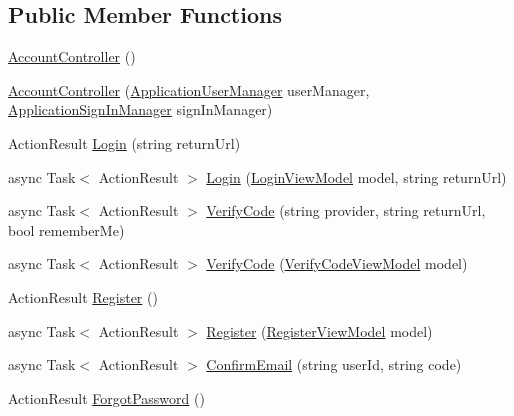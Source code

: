 \subsection*{Public Member Functions}
\begin{DoxyCompactItemize}
\item 
\hyperlink{class_bibabook_1_1_controllers_1_1_account_controller_a7d8fb75f85b1b2e21c791b8e7fbf2b04}{Account\+Controller} ()
\item 
\hyperlink{class_bibabook_1_1_controllers_1_1_account_controller_ae63289a87668ea58c877b1a898375a32}{Account\+Controller} (\hyperlink{class_bibabook_1_1_application_user_manager}{Application\+User\+Manager} user\+Manager, \hyperlink{class_bibabook_1_1_application_sign_in_manager}{Application\+Sign\+In\+Manager} sign\+In\+Manager)
\item 
Action\+Result \hyperlink{class_bibabook_1_1_controllers_1_1_account_controller_ad545238e18bd4f42815d3a51fb4b3fa5}{Login} (string return\+Url)
\item 
async Task$<$ Action\+Result $>$ \hyperlink{class_bibabook_1_1_controllers_1_1_account_controller_a4876c3d5288417f00e25b2b2c0f1eea6}{Login} (\hyperlink{class_bibabook_1_1_models_1_1_login_view_model}{Login\+View\+Model} model, string return\+Url)
\item 
async Task$<$ Action\+Result $>$ \hyperlink{class_bibabook_1_1_controllers_1_1_account_controller_a85aa51d27b3ca02a72111d1c1d4cf63f}{Verify\+Code} (string provider, string return\+Url, bool remember\+Me)
\item 
async Task$<$ Action\+Result $>$ \hyperlink{class_bibabook_1_1_controllers_1_1_account_controller_ac3836ca0db8ea4e9480d78e24e34d5d3}{Verify\+Code} (\hyperlink{class_bibabook_1_1_models_1_1_verify_code_view_model}{Verify\+Code\+View\+Model} model)
\item 
Action\+Result \hyperlink{class_bibabook_1_1_controllers_1_1_account_controller_a534052f3188710b4555416191646c991}{Register} ()
\item 
async Task$<$ Action\+Result $>$ \hyperlink{class_bibabook_1_1_controllers_1_1_account_controller_a593243bfd951f2fe98971f76a703d6fd}{Register} (\hyperlink{class_bibabook_1_1_models_1_1_register_view_model}{Register\+View\+Model} model)
\item 
async Task$<$ Action\+Result $>$ \hyperlink{class_bibabook_1_1_controllers_1_1_account_controller_aea98d3e70f9c6050ba9746a860d31837}{Confirm\+Email} (string user\+Id, string code)
\item 
Action\+Result \hyperlink{class_bibabook_1_1_controllers_1_1_account_controller_ab438507a72c59d1abc5426fb7e2968da}{Forgot\+Password} ()

\end{DoxyCompactItemize}
